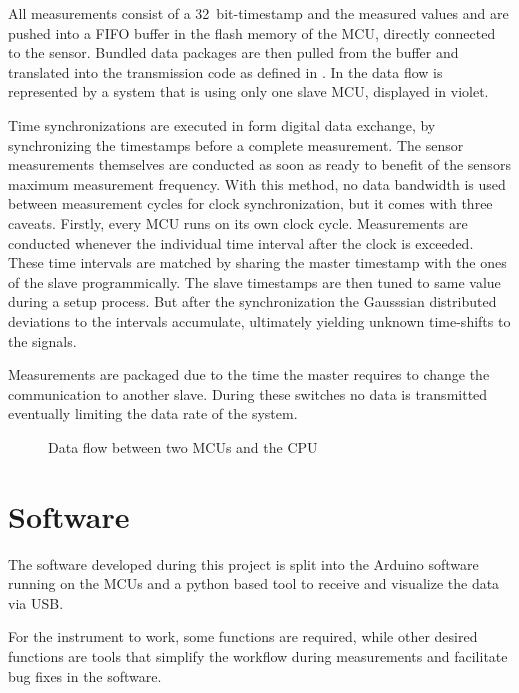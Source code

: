 All measurements consist of a \SI{32}{bit}-timestamp and the measured values and are pushed into a \ac{FIFO} buffer in the flash memory of the \ac{MCU}, directly connected to the sensor. Bundled data packages are then pulled from the buffer and translated into the transmission code as defined in . In  the data flow is represented by a system that is using only one slave \ac{MCU}, displayed in violet.

Time synchronizations are executed in form digital data exchange, by synchronizing the timestamps before a complete measurement. The sensor measurements themselves are conducted as soon as ready to benefit of the sensors maximum measurement frequency. With this method, no data bandwidth is used between measurement cycles for clock synchronization, but it comes with three caveats. Firstly, every \ac{MCU} runs on its own clock cycle. Measurements are conducted whenever the individual time interval after the clock is exceeded. These time intervals are matched by sharing the master timestamp with the ones of the slave programmically. The slave timestamps are then tuned to same value during a setup process. But after the synchronization the Gausssian distributed deviations to the intervals accumulate, ultimately yielding unknown time-shifts to the signals.

Measurements are packaged due to the time the master requires to change the communication to another slave. During these switches no data is transmitted eventually limiting the data rate of the system.

\begin{figure}[!htb]
  \centering
  
  \caption[Data flow]{Data flow between two \ac{MCU}s and the CPU%
    \label{fig:data_flow}}
\end{figure}
\clearpage

\section{Software}

The software developed during this project is split into the Arduino software running on the \acs{MCU}s and a python based tool to receive and visualize the data via \ac{USB}.

For the instrument to work, some functions are required, while other desired functions are tools that simplify the workflow during measurements and facilitate bug fixes in the software.

